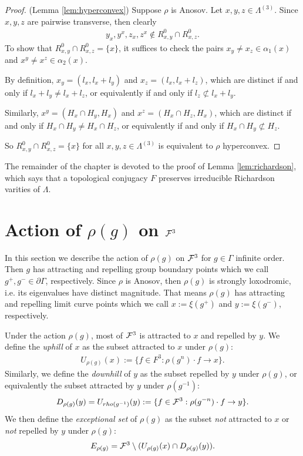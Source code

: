 \begin{proof}(Lemma \ref{lem:hyperconvex})
    Suppose $\rho$ is Anosov. Let $x,y,z \in \Lambda^{(3)}$.
    Since $x,y,z$ are pairwise transverse, then clearly
    \begin{align}
        y_x, y^x, z_x, z^x \not \in R^0_{x,y} \cap R^0_{x,z}.
    \end{align}
    To show that $R^0_{x,y} \cap R^0_{x,z} = \{x\}$,
    it suffices to check the pairs $x_y \neq x_z \in \alpha_1(x)$ and $x^y \neq x^z \in \alpha_2(x)$.
    
    By definition, $x_y = (l_x, l_x + l_y)$ and $x_z = (l_x, l_x + l_z)$, 
    which are distinct if and only if $l_x + l_y \neq l_x + l_z$, 
    or equivalently if and only if $l_z \not \subset l_x + l_y$.

    Similarly, $x^y = (H_x \cap H_y, H_x)$ and $x^z = (H_x \cap H_z, H_x)$, 
    which are distinct if and only if $H_x \cap H_y \neq H_x \cap H_z$, 
    or equivalently if and only if $H_x \cap H_y \not \subset H_z$.

    So $R^0_{x,y} \cap R^0_{x,z} = \{x\}$ for all $x,y,z \in \Lambda^{(3)}$ 
    is equivalent to $\rho$ hyperconvex. 
\end{proof}

The remainder of the chapter is devoted to the proof of Lemma \ref{lem:richardson},
which says that a topological conjugacy $F$ preserves irreducible Richardson varities of $\Lambda$.
\section{Action of $\rho(g)$ on $\mathcal{F}^3$}

In this section we describe the action of $\rho(g)$ on $\mathcal{F}^3$ 
for $g \in \Gamma$ infinite order. 
Then $g$ has attracting and repelling group boundary points
which we call $g^+, g^- \in \partial \Gamma$, respectively.
Since $\rho$ is Anosov, then $\rho(g)$ is strongly loxodromic, 
i.e. its eigenvalues have distinct magnitude.
That means $\rho(g)$ has attracting and repelling limit curve points 
which we call $x := \xi(g^+)$ and $y := \xi(g^-)$, respectively. 

Under the action $\rho(g)$, most of $\mathcal{F}^3$ is attracted to $x$ and repelled by $y$. 
We define the \emph{uphill} of $x$ as the subset attracted to $x$ under $\rho(g)$:
\begin{align}
    U_{\rho(g)}(x) := \{f \in F^3 : \rho(g^n) \cdot f \rightarrow x \}.
\end{align} 
Similarly, we define the \emph{downhill} of $y$ as the subset repelled by $y$ under $\rho(g)$, 
or equivalently the subset attracted by $y$ under $\rho(g^{-1})$:
\begin{align}
    D_{\rho(g)}(y) = U_{rho(g^{-1})}(y):= \{f \in \mathcal{F}^3 : \rho(g^{-n}) \cdot f \rightarrow y\}.
\end{align}
We then define the \emph{exceptional set} of $\rho(g)$ as the subset 
\emph{not} attracted to $x$ or \emph{not} repelled by $y$ under $\rho(g)$:
\begin{align}
    E_{\rho(g)} = \mathcal{F}^3 \setminus (U_{\rho(g)}(x) \cap D_{\rho(g)}(y)).
\end{align}


